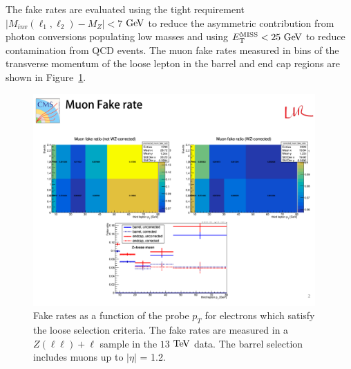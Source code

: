 The fake rates are evaluated using the tight requirement 
$|M_{inv}(\ell_{1},\ell_{2}) - M_{Z}| < 7 $ $\mathrm{Ge\kern -0.1em V}$ to reduce the asymmetric
contribution from photon conversions populating low masses and using $E_{\rm{T}}^{\rm{MISS}}<25\ \mathrm{Ge\kern -0.1em V}$ to reduce contamination from QCD events.
The muon fake rates measured in bins of the transverse momentum of the loose lepton in the barrel and end cap regions are shown in Figure~\ref{fig:os_fakerates}. 

\begin{figure}[tbh]
\centering
\includegraphics[width=4.25in]{Figures/RedBkg/FR_muons_ptl3_DataallTR.pdf}
  \caption{
Fake rates as a function of the probe $p_T$ for electrons which satisfy the loose selection criteria. The fake rates are measured in
a $Z(\ell\ell)+\ell$ sample in the $13$ $\mathrm{Te\kern -0.1em V}$ data.
The barrel selection includes muons up to $|\eta|$ = 1.2.
}
\label{fig:os_fakerates}
\end{figure}




